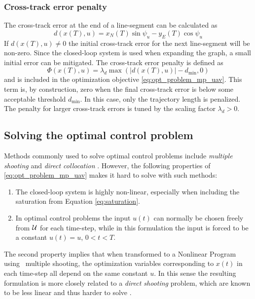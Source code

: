 \subsubsection{Cross-track error penalty}
The cross-track error at the end of a line-segment can be calculated as 
\begin{equation}
    d(x(T), u) = x_{N}(T)\sin\psi_u-y_{E}(T)\cos\psi_u
\end{equation}
If $d(x(T), u)\neq0$ the initial cross-track error for the next line-segment will be non-zero. 
Since the closed-loop system is used when expanding the graph, a small initial error can be mitigated.
The cross-track error penalty is defined as
\begin{equation}\label{eq:phi_d}
    \Phi(x(T), u)=\lambda_d\max(|d(x(T), u)|-d_{\text{min}},0)
\end{equation}
and is included in the optimization objective \eqref{eq:opt_problem_mp_uav}. 
This term is, by construction, zero when the final cross-track error is below some acceptable threshold $d_{\text{min}}$. In this case, only the trajectory length is penalized. 
The penalty for larger cross-track errors is tuned by the scaling factor $\lambda_d>0$.

\subsection{Solving the optimal control problem}
Methods commonly used to solve optimal control problems include \textit{multiple shooting} 
and \textit{direct collocation} \cite{multiple_shooting}. 
However, the following properties of \eqref{eq:opt_problem_mp_uav} makes it hard to solve with such methods:
\begin{enumerate}
    \item The closed-loop system is highly non-linear, especially when including the saturation from Equation \eqref{eq:saturation}.
    \item In optimal control problems the input $u(t)$ can normally be chosen freely from $\mathcal{U}$ for each time-step, while 
    in this formulation the input is forced to be a constant $u(t)=u$, $0<t<T$.
\end{enumerate}
The second property implies that when transformed to a Nonlinear Program using \eg\ multiple shooting,
the optimization variables corresponding to $x(t)$ in each time-step all depend on the same constant $u$. In this sense the resulting formulation is 
more closely related to a \textit{direct shooting} problem, which are known to be less linear and thus harder to solve \cite{multiple_shooting}.

